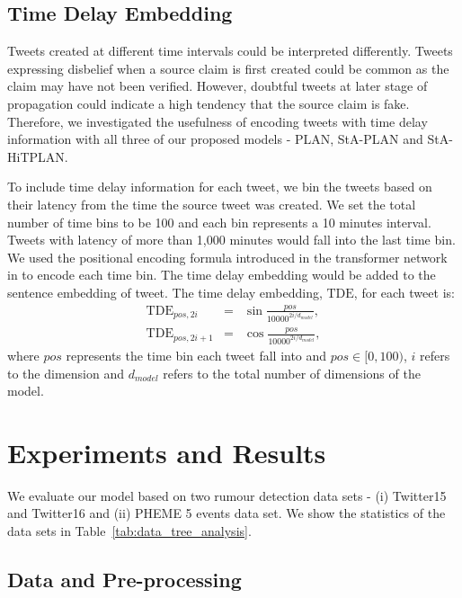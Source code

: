 \documentclass[letterpaper]{article} %
\begin{document}
\subsection{Time Delay Embedding}
\label{sec:timedelay}
Tweets created at different time intervals could be interpreted differently. Tweets expressing disbelief when a source claim is first created could be common as the claim may have not been verified. However, doubtful tweets at later stage of propagation could indicate a high tendency that the source claim is fake. Therefore, we investigated the usefulness of encoding tweets with time delay information with all three of our proposed models - PLAN, StA-PLAN and StA-HiTPLAN.

To include time delay information for each tweet, we bin the tweets based on their latency from the time the source tweet was created. We set the total number of time bins to be 100 and each bin represents a 10 minutes interval. Tweets with latency of more than 1,000 minutes would fall into the last time bin.
We used the positional encoding formula introduced in the transformer network in \citet{DBLP:journals/corr/VaswaniSPUJGKP17} to encode each time bin. The time delay embedding would be added to the sentence embedding of tweet. The time delay embedding, $\mathrm{TDE}$, for each tweet is:
\begin{eqnarray}
\mathrm{TDE}_{pos,2i} &=& \sin \frac{pos}{10000^{2i/d_{model}}}, \\
\mathrm{TDE}_{pos,2i+1} &=& \cos \frac{pos}{10000^{2i/d_{model}}},
\end{eqnarray}
where $pos$ represents the time bin each tweet fall into and $pos \in [0,100)$, $i$ refers to the dimension and $d_{model}$ refers to the total number of dimensions of the model.
\newcommand{\tabitem}{~~\llap{\textbullet}~~}
\section{Experiments and Results}

We evaluate our model based on two rumour detection data sets - (i) Twitter15 and Twitter16 and (ii) PHEME 5 events data set. We show the statistics of the data sets in Table~\ref{tab:data_tree_analysis}.

\subsection{Data and Pre-processing} \label{data_pre_processing}
\end{document}
